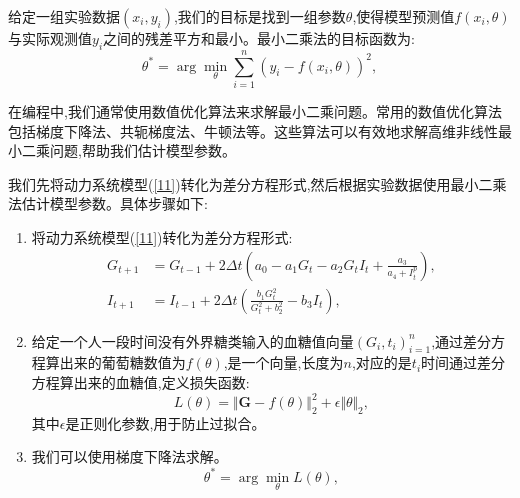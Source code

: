 \begin{defn}[最小二乘法]
    给定一组实验数据$(x_i, y_i)$,我们的目标是找到一组参数$\theta$,使得模型预测值$f(x_i, \theta)$与实际观测值$y_i$之间的残差平方和最小。最小二乘法的目标函数为:
    \begin{equation}
        \theta^* = \arg\min_{\theta} \sum_{i=1}^{n} (y_i - f(x_i, \theta))^2,
    \end{equation}
\end{defn}

在编程中,我们通常使用数值优化算法来求解最小二乘问题。常用的数值优化算法包括梯度下降法、共轭梯度法、牛顿法等。这些算法可以有效地求解高维非线性最小二乘问题,帮助我们估计模型参数。

我们先将动力系统模型(\ref{11})转化为差分方程形式,然后根据实验数据使用最小二乘法估计模型参数。具体步骤如下:

\begin{enumerate}
    \item 将动力系统模型(\ref{11})转化为差分方程形式:
          \begin{equation}
              \begin{aligned}
                  G_{t+1} & = G_{t-1} + 2\Delta t \left(a_0-a_1G_t-a_2G_tI_t+\frac{a_3}{a_4+I_t^p}\right), \\
                  I_{t+1} & = I_{t-1} + 2\Delta t \left(\frac{b_1 G_t^2}{G_t^2 + b_2^2} - b_3 I_t\right),
              \end{aligned}
          \end{equation}
    \item 给定一个人一段时间没有外界糖类输入的血糖值向量$(G_i,t_i)_{i=1}^n$,通过差分方程算出来的葡萄糖数值为$f(\theta)$,是一个向量,长度为$n$,对应的是$t_i$时间通过差分方程算出来的血糖值,定义损失函数:
          \begin{equation}
              L(\theta) = \Vert\mathbf{G}-f(\theta) \Vert_2^2+\epsilon\Vert \theta \Vert_2,
          \end{equation}
          其中$\epsilon$是正则化参数,用于防止过拟合。
    \item 我们可以使用梯度下降法求解。
          \begin{equation}
              \theta^* = \arg\min_{\theta} L(\theta),
          \end{equation}
\end{enumerate}

